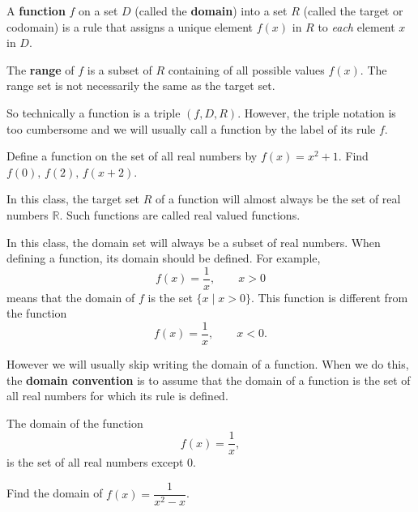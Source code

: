 \documentclass[calc1-main.tex]{subfiles}
\begin{document}
  A \textbf{function} $f$ on a set $D$ (called the \textbf{domain}) into a set $R$ (called the target or codomain) is a rule that assigns a unique element $f(x)$ in $R$ to \textit{each} element $x$ in $D$.

  The \textbf{range} of $f$ is a subset of $R$ containing of all possible values $f(x)$. The range set is not necessarily the same as the target set.

  So technically a function is a triple $(f, D, R)$. However, the triple notation is too cumbersome and we will usually call a function by the label of its rule $f$.

  \begin{figure}[H]
    \centering
    \begin{subfigure}{0.3\textwidth}
      \centering
      
    \end{subfigure}
    \begin{subfigure}{0.3\textwidth}
      \centering
      
    \end{subfigure}
  \end{figure}

  \begin{example}
    Define a function on the set of all real numbers by $f(x)=x^2+1$. Find $f(0), \, f(2), \, f(x+2)$.
  \end{example}

  In this class, the target set $R$ of a function will almost always be the set of real numbers $\mathbb{R}$. Such functions are called real valued functions.

  In this class, the domain set will always be a subset of real numbers. When defining a function, its domain should be defined. For example,
  \[
    f(x) = \frac{1}{x}, \qquad x > 0
  \]
  means that the domain of $f$ is the set $\{x \mid x > 0\}$. This function is different from the function
  \[
    f(x) = \frac{1}{x}, \qquad x < 0.
  \]

  However we will usually skip writing the domain of a function. When we do this, the \textbf{domain convention} is to assume that the domain of a function is the set of all real numbers for which its rule is defined.

  The domain of the function
  \[
    f(x)=\frac{1}{x},
  \]
  is the set of all real numbers except $0$.


  \begin{example}
    Find the domain of $f(x) = \dfrac{1}{x^2 - x}$.
  \end{example}
\end{document}
